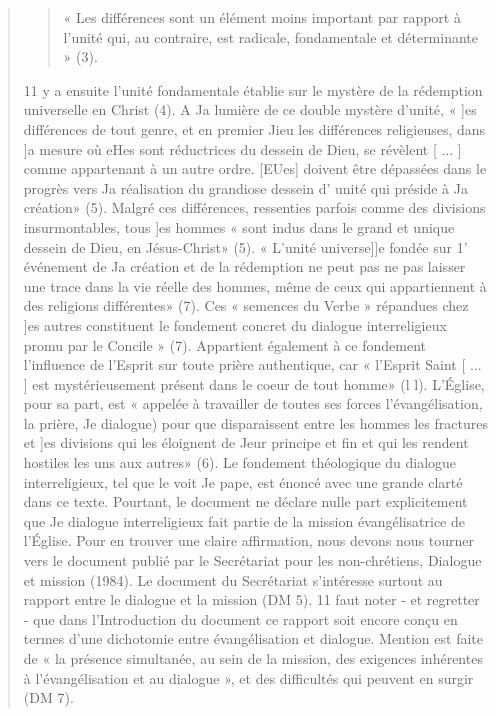 \begin{quote}
\begin{quote}
« Les différences
sont un élément moins important par rapport à l'unité
qui, au contraire, est radicale, fondamentale et déterminante »
(3). 
\end{quote}
 11 y a ensuite l'unité fondamentale établie sur le mystère
de la rédemption universelle en Christ (4). A Ja lumière de ce
double mystère d'unité, « ]es différences de tout genre, et en
premier Jieu les différences religieuses, dans ]a mesure où eHes
sont réductrices du dessein de Dieu, se révèlent [ ... ] comme
appartenant à un autre ordre. [EUes] doivent être dépassées
dans le progrès vers Ja réalisation du grandiose dessein d' unité
qui préside à Ja création» (5). Malgré ces différences, ressenties
parfois comme des divisions insurmontables, tous ]es
hommes « sont indus dans le grand et unique dessein de Dieu,
en Jésus-Christ» (5). « L'unité universe]]e fondée sur 1' événement
de Ja création et de la rédemption ne peut pas ne pas laisser
une trace dans la vie réelle des hommes, même de ceux qui
appartiennent à des religions différentes» (7). Ces « semences
du Verbe » répandues chez ]es autres constituent le fondement
concret du dialogue interreligieux promu par le Concile » (7).
Appartient également à ce fondement l'influence de l'Esprit
sur toute prière authentique, car « l'Esprit Saint [ ... ] est mystérieusement
présent dans le coeur de tout homme» (l l). L'Église,
pour sa part, est « appelée à travailler de toutes ses forces
l'évangélisation, la prière, Je dialogue) pour que disparaissent
entre les hommes les fractures et ]es divisions qui les éloignent
de Jeur principe et fin et qui les rendent hostiles les uns aux
autres» (6).
Le fondement théologique du dialogue interreligieux, tel
que le voit Je pape, est énoncé avec une grande clarté dans ce
texte. Pourtant, le document ne déclare nulle part explicitement
que Je dialogue interreligieux fait partie de la mission
évangélisatrice de l'Église.  
Pour en trouver une claire affirmation,
nous devons nous tourner vers le document publié par
le Secrétariat pour les non-chrétiens, Dialogue et mission
(1984). Le document du Secrétariat s'intéresse surtout au rapport
entre le dialogue et la mission (DM 5). 11 faut noter - et regretter
- que dans l'Introduction du document ce rapport soit
encore conçu en termes d'une dichotomie entre évangélisation
et dialogue. Mention est faite de « la présence simultanée, au
sein de la mission, des exigences inhérentes à l'évangélisation
et au dialogue », et des difficultés qui peuvent en surgir (DM 7).

\end{quote}
